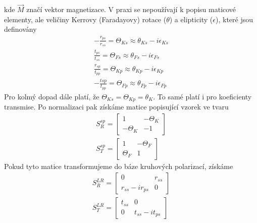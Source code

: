 kde $\vec{M}$ značí vektor magnetizace.
V praxi se nepoužívají k popisu maticové elementy, ale veličiny Kerrovy (Faradayovy) rotace ($\theta$)  a elipticity ($\epsilon$), které jsou definovány
\begin{eqnarray}
-\frac{r_{ps}}{r_{ss}}=\Theta_{Ks} \approx \theta_{Ks} -i\epsilon_{Ks} \\
\frac{t_{ps}}{t_{ss}}=\Theta_{Fs} \approx \theta_{Fs}-i\epsilon_{Fs} \\
\frac{r_{sp}}{t_{pp}} = \Theta_{Kp} \approx \theta_{Kp} -i\epsilon_{Kp}\\
-\frac{t{sp}}{t_{pp}} = \Theta_{Fp} \approx \theta_{Fp}-i\epsilon_{Fp}
\end{eqnarray}
Pro kolmý dopad dále platí, že $\Theta_{Ks}=\Theta_{Kp}=\theta_K$. To samé platí i pro koeficienty transmise. Po normalizaci pak získáme matice popisující vzorek ve tvaru
\begin{eqnarray}
S_R^{sp}=\begin{bmatrix}1&-\Theta_K \\ -\Theta_K & -1 \end{bmatrix} \\
S_T^{sp}=\begin{bmatrix}1&-\Theta_F \\ \Theta_F& 1 \end{bmatrix}
\end{eqnarray}
Pokud tyto matice transformujeme do báze kruhových polarizací, získáme
\begin{eqnarray}
S_R^{LR}=\begin{bmatrix}0 & r_{ss}\\ r_{ss}-ir_{ps}&0\end{bmatrix} \\
S_T^{LR}=\begin{bmatrix}t_{ss} & 0 \\ 0& t_{ss}-it_{ps}\end{bmatrix}
\end{eqnarray}
